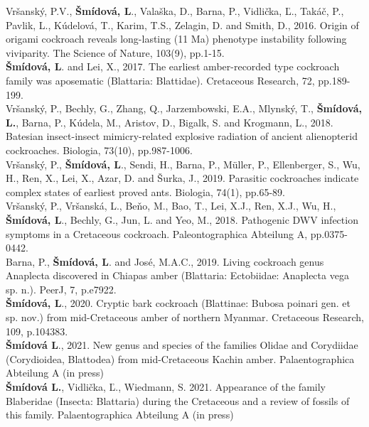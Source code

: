 \documentclass[11pt]{article} %
\begin{document}
Vršanský, P.V., \textbf{Šmídová, L}., Valaška, D., Barna, P., Vidlička, Ľ., Takáč, P., Pavlik, L., Kúdelová, T., Karim, T.S., Zelagin, D. and Smith, D., 2016. Origin of origami cockroach reveals long-lasting (11 Ma) phenotype instability following viviparity. The Science of Nature, 103(9), pp.1-15. \\
\textbf{Šmídová, L}. and Lei, X., 2017. The earliest amber-recorded type cockroach family was aposematic (Blattaria: Blattidae). Cretaceous Research, 72, pp.189-199.\\
Vršanský, P., Bechly, G., Zhang, Q., Jarzembowski, E.A., Mlynský, T., \textbf{Šmídová, L.}, Barna, P., Kúdela, M., Aristov, D., Bigalk, S. and Krogmann, L., 2018. Batesian insect-insect mimicry-related explosive radiation of ancient alienopterid cockroaches. Biologia, 73(10), pp.987-1006.\\
Vršanský, P., \textbf{Šmídová, L}., Sendi, H., Barna, P., Müller, P., Ellenberger, S., Wu, H., Ren, X., Lei, X., Azar, D. and Šurka, J., 2019. Parasitic cockroaches indicate complex states of earliest proved ants. Biologia, 74(1), pp.65-89.\\
Vršanský, P., Vršanská, L., Beňo, M., Bao, T., Lei, X.J., Ren, X.J., Wu, H., \textbf{Šmídová, L}., Bechly, G., Jun, L. and Yeo, M., 2018. Pathogenic DWV infection symptoms in a Cretaceous cockroach. Paleontographica Abteilung A, pp.0375-0442.\\
Barna, P., \textbf{Šmídová, L}. and José, M.A.C., 2019. Living cockroach genus Anaplecta discovered in Chiapas amber (Blattaria: Ectobiidae: Anaplecta vega sp. n.). PeerJ, 7, p.e7922.\\
 \textbf{Šmídová, L}., 2020. Cryptic bark cockroach (Blattinae: Bubosa poinari gen. et sp. nov.) from mid-Cretaceous amber of northern Myanmar. Cretaceous Research, 109, p.104383.\\
\textbf{Šmídová L}., 2021. New genus and species of the families Olidae and Corydiidae (Corydioidea, Blattodea) from mid-Cretaceous Kachin amber. Palaentographica Abteilung A (in press)\\
 \textbf{Šmídová L.}, Vidlička, Ľ., Wiedmann, S. 2021. Appearance of the family Blaberidae (Insecta: Blattaria) during the Cretaceous and a review of fossils of this family. Palaentographica Abteilung A (in press)\begin{flushleft}
\end{flushleft}
\end{document}
